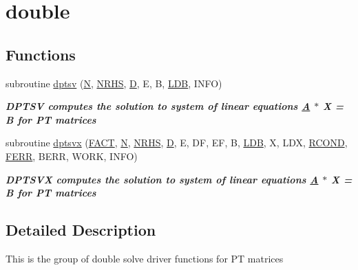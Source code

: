 \hypertarget{group__doublePTsolve}{}\section{double}
\label{group__doublePTsolve}
\subsection*{Functions}
\begin{DoxyCompactItemize}
\item 
subroutine \hyperlink{group__doublePTsolve_gaf1bd4c731915bd8755a4da8086fd79a8}{dptsv} (\hyperlink{polmisc_8c_a0240ac851181b84ac374872dc5434ee4}{N}, \hyperlink{example__user_8c_aa0138da002ce2a90360df2f521eb3198}{N\+R\+H\+S}, \hyperlink{odrpack_8h_a7dae6ea403d00f3687f24a874e67d139}{D}, E, B, \hyperlink{example__user_8c_a50e90a7104df172b5a89a06c47fcca04}{L\+D\+B}, I\+N\+F\+O)
\begin{DoxyCompactList}\small\item\em {\bfseries  D\+P\+T\+S\+V computes the solution to system of linear equations \hyperlink{classA}{A} $\ast$ X = B for P\+T matrices} \end{DoxyCompactList}\item 
subroutine \hyperlink{group__doublePTsolve_ga9584fd037291be2dff42741bb3215772}{dptsvx} (\hyperlink{superlu__enum__consts_8h_af00a42ecad444bbda75cde1b64bd7e72a1b6692b56d378abb85bd49063721d034}{F\+A\+C\+T}, \hyperlink{polmisc_8c_a0240ac851181b84ac374872dc5434ee4}{N}, \hyperlink{example__user_8c_aa0138da002ce2a90360df2f521eb3198}{N\+R\+H\+S}, \hyperlink{odrpack_8h_a7dae6ea403d00f3687f24a874e67d139}{D}, E, D\+F, E\+F, B, \hyperlink{example__user_8c_a50e90a7104df172b5a89a06c47fcca04}{L\+D\+B}, X, L\+D\+X, \hyperlink{superlu__enum__consts_8h_af00a42ecad444bbda75cde1b64bd7e72a9b5c151728d8512307565994c89919d5}{R\+C\+O\+N\+D}, \hyperlink{superlu__enum__consts_8h_af00a42ecad444bbda75cde1b64bd7e72a78fd14d7abebae04095cfbe02928f153}{F\+E\+R\+R}, B\+E\+R\+R, W\+O\+R\+K, I\+N\+F\+O)
\begin{DoxyCompactList}\small\item\em {\bfseries  D\+P\+T\+S\+V\+X computes the solution to system of linear equations \hyperlink{classA}{A} $\ast$ X = B for P\+T matrices} \end{DoxyCompactList}\end{DoxyCompactItemize}


\subsection{Detailed Description}
This is the group of double solve driver functions for P\+T matrices 


